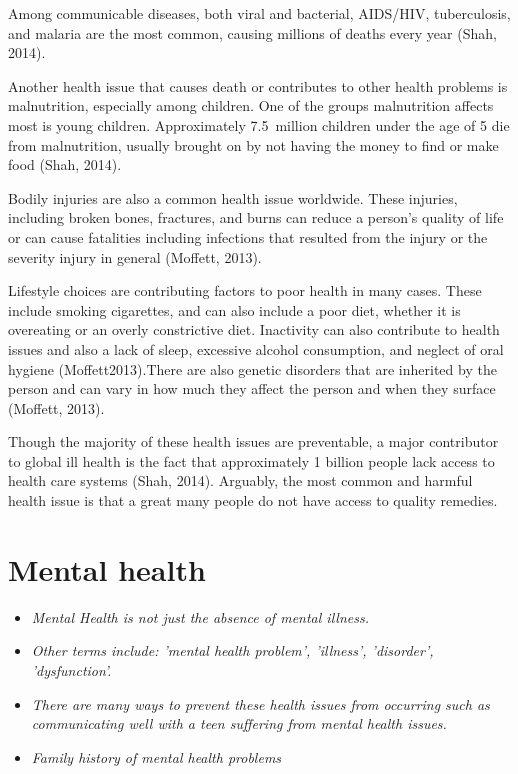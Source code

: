 Among communicable diseases, both viral and bacterial, AIDS/HIV,
tuberculosis, and malaria are the most common, causing millions of
deaths every year (Shah, 2014).

Another health issue that causes death or contributes to other health
problems is malnutrition, especially among children. One of the groups
malnutrition affects most is young children. Approximately 7.5~million
children under the age of 5 die from malnutrition, usually brought on by
not having the money to find or make food (Shah, 2014).

Bodily injuries are also a common health issue worldwide. These
injuries, including broken bones, fractures, and burns can reduce a
person's quality of life or can cause fatalities including infections
that resulted from the injury or the severity injury in general
(Moffett, 2013).

Lifestyle choices are contributing factors to poor health in many cases.
These include smoking cigarettes, and can also include a poor diet,
whether it is overeating or an overly constrictive diet. Inactivity can
also contribute to health issues and also a lack of sleep, excessive
alcohol consumption, and neglect of oral hygiene (Moffett2013).There are
also genetic disorders that are inherited by the person and can vary in
how much they affect the person and when they surface (Moffett, 2013).

Though the majority of these health issues are preventable, a major
contributor to global ill health is the fact that approximately 1
billion people lack access to health care systems (Shah, 2014).
Arguably, the most common and harmful health issue is that a great many
people do not have access to quality remedies.

\section{Mental health}\label{mental-health}

\begin{itemize}
\item
  \emph{Mental Health is not just the absence of mental illness.}
\item
  \emph{Other terms include: 'mental health problem', 'illness',
  'disorder', 'dysfunction'.}
\item
  \emph{There are many ways to prevent these health issues from
  occurring such as communicating well with a teen suffering from mental
  health issues.}
\item
  \emph{Family history of mental health problems}
\end{itemize}

